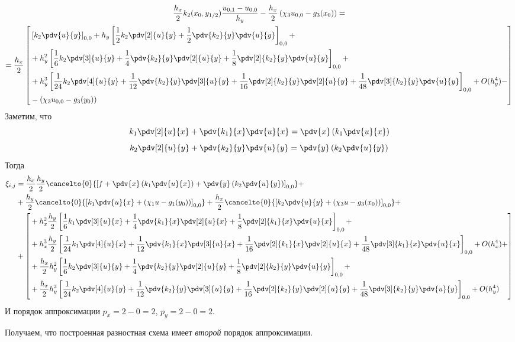 \begin{multline*}
    \frac{h_x}{2}  k_2(x_{0},y_{1/2}) \frac{u_{0,1} - u_{0,0}}{h_y} - \frac{h_x}{2} \left( \chi_3 u_{0,0} - g_3(x_{0}) \right) = \\
    = \frac{h_x}{2} \left[ \begin{aligned}
        & \left[ k_2 \pdv{u}{y} \right]_{0,0} +
        h_y \left[ \frac{1}{2} k_2 \pdv[2]{u}{y} + \frac{1}{2} \pdv{k_2}{y} \pdv{u}{y} \right]_{0,0} + \\
        & + h_y^2 \left[ \frac{1}{6} k_2 \pdv[3]{u}{y} + \frac{1}{4} \pdv{k_2}{y} \pdv[2]{u}{y} + \frac{1}{8} \pdv[2]{k_2}{y} \pdv{u}{y} \right]_{0,0} + \\
        & + h_y^3 \left[ \frac{1}{24} k_2 \pdv[4]{u}{y} + \frac{1}{12} \pdv{k_2}{y} \pdv[3]{u}{y} + \frac{1}{16} \pdv[2]{k_2}{y} \pdv[2]{u}{y} + \frac{1}{48} \pdv[3]{k_2}{y} \pdv{u}{y} \right]_{0,0} + O(h_y^4) - \\
        & - \left( \chi_3 u_{0,0} - g_3(y_{0}) \right)
    \end{aligned} \right]
\end{multline*}
Заметим, что
\[ k_1 \pdv[2]{u}{x} + \pdv{k_1}{x} \pdv{u}{x} = \pdv{x} \left( k_1 \pdv{u}{x} \right) \]
\[ k_2 \pdv[2]{u}{y} + \pdv{k_2}{y} \pdv{u}{y} = \pdv{y} \left( k_2 \pdv{u}{y} \right) \]
Тогда
\[
    \begin{split}
        \xi_{i,j} &= \frac{h_x}{2} \frac{h_y}{2} \cancelto{0}{\left[ f + \pdv{x} \left( k_1 \pdv{u}{x} \right) + \pdv{y} \left( k_2 \pdv{u}{y} \right) \right]_{0,0}} + \\
        &+ \frac{h_y}{2} \cancelto{0}{\left[ k_1 \pdv{u}{x} + \left( \chi_1 u - g_1(y_{0}) \right) \right]_{0,0}} + \frac{h_x}{2} \cancelto{0}{\left[ k_2 \pdv{u}{y} + \left( \chi_3 u - g_3(x_{0}) \right) \right]_{0,0}} + \\
        &+ \left[
        \begin{aligned}
            & + h_x^2 \frac{h_y}{2} \left[ \frac{1}{6} k_1 \pdv[3]{u}{x} + \frac{1}{4} \pdv{k_1}{x} \pdv[2]{u}{x} + \frac{1}{8} \pdv[2]{k_1}{x} \pdv{u}{x} \right]_{0,0} + \\
            & + h_x^3 \frac{h_y}{2} \left[ \frac{1}{24} k_1 \pdv[4]{u}{x} + \frac{1}{12} \pdv{k_1}{x} \pdv[3]{u}{x} + \frac{1}{16} \pdv[2]{k_1}{x} \pdv[2]{u}{x} + \frac{1}{48} \pdv[3]{k_1}{x} \pdv{u}{x} \right]_{0,0} + O(h_x^4) + \\
            & + \frac{h_x}{2} h_y^2 \left[ \frac{1}{6} k_2 \pdv[3]{u}{y} + \frac{1}{4} \pdv{k_2}{y} \pdv[2]{u}{y} + \frac{1}{8} \pdv[2]{k_2}{y} \pdv{u}{y} \right]_{0,0} + \\
            & + \frac{h_x}{2} h_y^3 \left[ \frac{1}{24} k_2 \pdv[4]{u}{y} + \frac{1}{12} \pdv{k_2}{y} \pdv[3]{u}{y} + \frac{1}{16} \pdv[2]{k_2}{y} \pdv[2]{u}{y} + \frac{1}{48} \pdv[3]{k_2}{y} \pdv{u}{y} \right]_{0,0} + O(h_y^4) \\
        \end{aligned}
        \right]
    \end{split}
\]
И порядок аппроксимации $p_x = 2 - 0 = 2$, $p_y = 2 - 0 = 2$.

Получаем, что построенная разностная схема имеет \textit{второй}
порядок аппроксимации.